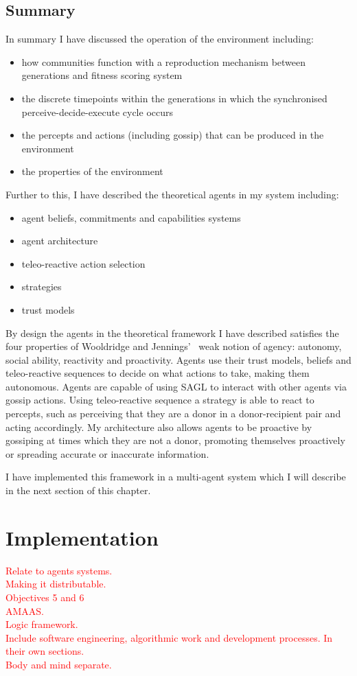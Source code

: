 \documentclass[]{final_report}
\begin{document}
\subsection{Summary}
\noindent
In summary I have discussed the operation of the environment including:
\begin{itemize}
	\item how communities function with a reproduction mechanism between generations and fitness scoring system
	\item the discrete timepoints within the generations in which the synchronised perceive-decide-execute cycle occurs
	\item the percepts and actions (including gossip) that can be produced in the environment
	\item the properties of the environment
\end{itemize} 
Further to this, I have described the theoretical agents in my system including:
\begin{itemize}
	\item agent beliefs, commitments and capabilities systems
	\item agent architecture
	\item teleo-reactive action selection
	\item strategies
	\item trust models
\end{itemize}
\par
By design the agents in the theoretical framework I have described satisfies the four properties of Wooldridge and Jennings'~\cite{wooldridge_jennings_1995} weak notion of agency: autonomy, social ability, reactivity and proactivity. Agents use their trust models, beliefs and teleo-reactive sequences to decide on what actions to take, making them autonomous. Agents are capable of using SAGL to interact with other agents via gossip actions. Using teleo-reactive sequence a strategy is able to react to percepts, such as perceiving that they are a donor in a donor-recipient pair and acting accordingly. My architecture also allows agents to be proactive by gossiping at times which they are not a donor, promoting themselves proactively or spreading accurate or inaccurate information.\par
I have implemented this framework in a multi-agent system which I will describe in the next section of this chapter.

\section{Implementation}
\textcolor{red}{Relate to agents systems.\\
Making it distributable.\\
Objectives 5 and 6\\
AMAAS.\\
Logic framework.\\
Include software engineering, algorithmic work and development processes. In their own sections.\\
Body and mind separate.}\par
\end{document}
